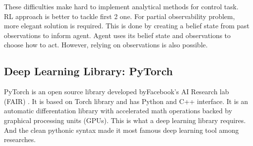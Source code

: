 These difficulties make hard to implement analytical methods for control task. RL approach is better to tackle first 2 one. For partial observability problem, more elegant solution is required. This is done by creating a belief state from past observations to inform agent. Agent uses its belief state and observations to choose how to act. However, relying on observations is also possible.

\subsection{Deep Learning Library: PyTorch}
\label{dl_pytorch}
PyTorch is an open source library developed byFacebook's AI Research lab (FAIR) \cite{paszke_pytorch_2019}. It is based on Torch library \cite{collobert_torch7_2011} and has Python and C++ interface. It is an automatic differentation library with accelerated math operations backed by graphical processing units (GPUs). This is what a deep learning library requires. And the clean pythonic syntax made it most famous deep learning tool among researches. 
